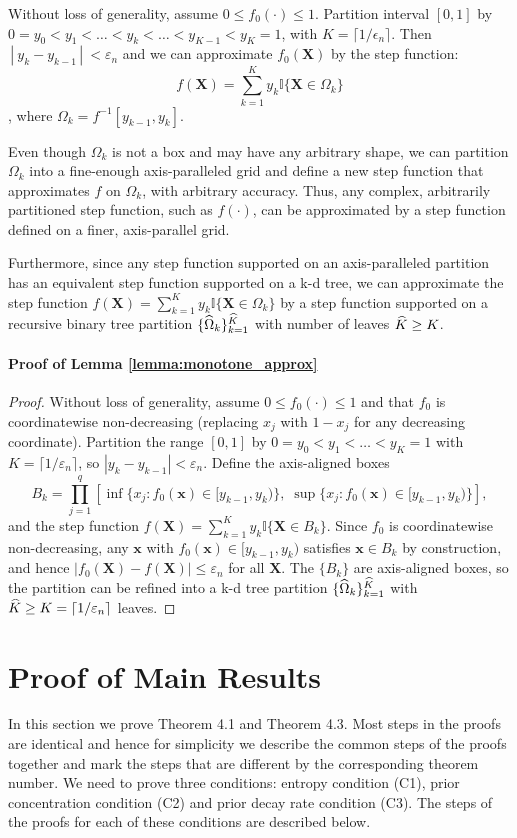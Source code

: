 \documentclass[12pt]{article}
\newcommand{\bm}[1]{\boldsymbol{#1}}
\newcommand{\1}{\mathbb{I}}
\newcommand{\wh}[1]{\smash{\widehat{#1}}}
\def\C {\,|\:}
\def\C {\,|\:}
\def\X{\bm{X}}
\def\x{\bm{x}}
\def\C{\mbox{\boldmath$C$}}
\def\x{\mbox{\boldmath$x$}}
\def\X{\mbox{\boldmath$X$}}
\def\C {\,|\:}
\def\C {\,|\:}
\def\X{\bm{X}}
\def\x{\bm{x}}
\theoremstyle{plain}
\theoremstyle{definition}
\theoremstyle{remark}
\begin{document}
Without loss of generality, assume $0 \le f_0(\cdot) \le 1$. Partition interval $[0,1]$ by $0 = y_0 < y_1 < \dots < y_k< \dots < y_{K-1} < y_K = 1$, with $K=\lceil 1/\epsilon_n \rceil$. Then $\C y_k-y_{k-1} \C < \varepsilon_n$ and we can approximate $f_0(\X)$ by the step function:
$$ f(\X)= \sum_{k=1}^K y_k \mathbb{I}\{\X \in \Omega_k\}$$,
where $\Omega_k=f^{-1}[y_{k-1},y_k]$.

Even though $\Omega_k$ is not a box and may have any arbitrary shape, we can partition $\Omega_k$ into a fine-enough axis-paralleled grid and define a new step function that approximates $f$ on $\Omega_k$, with arbitrary accuracy. Thus, any complex, arbitrarily partitioned step function, such as $f(\cdot)$, can be approximated by a step function defined on a finer, axis-parallel grid.

Furthermore, since any step function supported on an axis-paralleled partition has an equivalent step function supported on a k-d tree, we can approximate the step function $ f(\X)= \sum_{k=1}^K y_k \mathbb{I}\{\X \in \Omega_k\}$ by a step function supported on a recursive binary tree partition $\{\wh{\Omega}_k\}_{k=1}^{\wh{K}}$ with number of leaves $\wh{K} \ge K$.
\fi
\paragraph{Proof of Lemma \ref{lemma:monotone_approx}}
\begin{proof}
Without loss of generality, assume $0 \le f_0(\cdot) \le 1$ and that $f_0$ is 
coordinatewise non-decreasing (replacing $x_j$ with $1-x_j$ for any 
decreasing coordinate). Partition the range $[0,1]$ by 
$0=y_0 < y_1 < \dots < y_K=1$ with $K=\lceil 1/\varepsilon_n \rceil$, 
so $|y_k - y_{k-1}| < \varepsilon_n$. Define the axis-aligned boxes
$$
B_k = \prod_{j=1}^q \left[\inf\{x_j : f_0(\x) \in [y_{k-1},y_k)\},\; 
                          \sup\{x_j : f_0(\x) \in [y_{k-1},y_k)\}\right],
$$
and the step function $f(\X) = \sum_{k=1}^K y_k \mathbb{I}\{\X \in B_k\}$. 
Since $f_0$ is coordinatewise non-decreasing, any $\x$ with 
$f_0(\x) \in [y_{k-1}, y_k)$ satisfies $\x \in B_k$ by construction, 
and hence $|f_0(\X) - f(\X)| \le \varepsilon_n$ for all $\X$. The 
$\{B_k\}$ are axis-aligned boxes, so the partition can be refined into 
a k-d tree partition $\{\wh\Omega_k\}_{k=1}^{\wh K}$ with 
$\wh K \ge K = \lceil 1/\varepsilon_n \rceil$ leaves.
\end{proof}

\section{Proof of Main Results}\label{sec:result_proof}
In this section we prove Theorem 4.1 and Theorem 4.3. Most steps in the proofs are identical and hence for simplicity we describe the common steps of the proofs together and mark the steps that are different by the corresponding theorem number. We need to prove three conditions: entropy condition (C1), prior concentration condition (C2) and prior decay rate condition (C3). The steps of the proofs for each of these conditions are described below.
\end{document}
